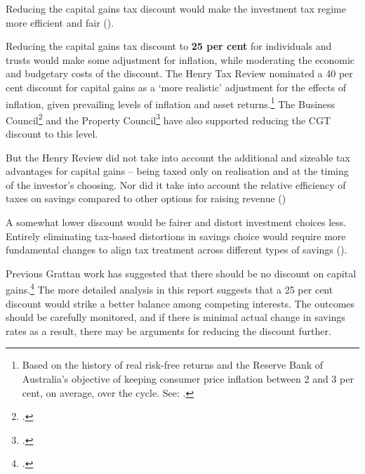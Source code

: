 Reducing the capital gains tax discount would make the investment tax regime more efficient and fair (). 

Reducing the capital gains tax discount to \textbf{25 per cent} for individuals and trusts would make some adjustment for inflation, while moderating the economic and budgetary costs of the discount. The Henry Tax Review nominated a 40 per cent discount for capital gains as a ‘more realistic’ adjustment for the effects of inflation, given prevailing levels of inflation and asset returns.\footnote{Based on the history of real risk-free returns and the Reserve Bank of Australia’s objective of keeping consumer price inflation between 2 and 3 per cent, on average, over the cycle. See: \textcite[][72]{HenryTaxReview2010}.}  The Business Council\footcite[][64]{BCA2016}  and the Property Council\footcite{Vickery2016}  have also supported reducing the CGT discount to this level. 

But the Henry Review did not take into account the additional and sizeable tax advantages for capital gains – being taxed only on realisation and at the timing of the investor’s choosing. Nor did it take into account the relative efficiency of taxes on savings compared to other options for raising revenue ()

A somewhat lower discount would be fairer and distort investment choices less. 
Entirely eliminating tax-based distortions in savings choice would require more fundamental changes to align tax treatment across different types of savings (). 

Previous Grattan work has suggested that there should be no discount on capital gains.\footcite[][40--43]{DaleyMcGannonSavageEtAl2013BalancingBudgets}  
The more detailed analysis in this report suggests that a 25 per cent discount would strike a better balance among competing interests. The outcomes should be carefully monitored, and if there is minimal actual change in savings rates as a result, there may be arguments for reducing the discount further.

